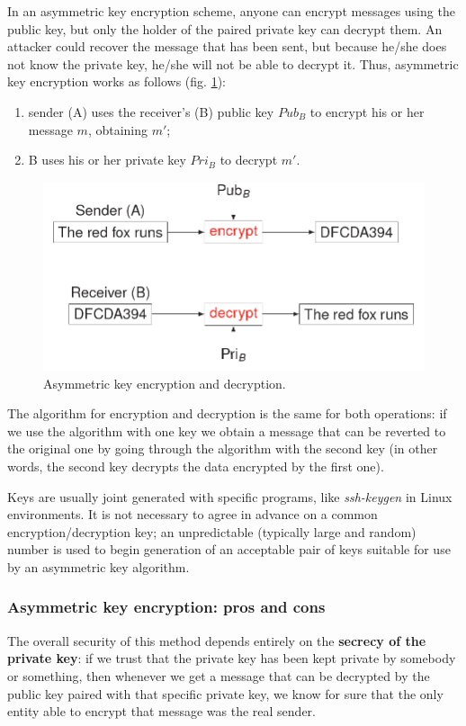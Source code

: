 In an asymmetric key encryption scheme, anyone can encrypt messages using the public key, but only the holder of the paired private key can decrypt them.  An attacker could recover the message that has been sent, but because he/she does not know the private key, he/she will not be able to decrypt it. Thus, asymmetric key encryption works as follows (fig. \ref{fig:asymm}):

\begin{enumerate}
    \item sender (A) uses the receiver's (B) public key $Pub_B$ to encrypt his or her message $m$, obtaining $m'$;
    \item B uses his or her private key $Pri_B$ to decrypt $m'$.
\end{enumerate}

\begin{figure}[H]
\centering
\includegraphics[scale=0.5]{img/asymmkey.png}
\decoRule
\caption{Asymmetric key encryption and decryption.}
\label{fig:asymm}
\end{figure}

The algorithm for encryption and decryption is the same for both operations: if we use the algorithm with one key we obtain a message that can be reverted to the original one by going through the algorithm with the second key (in other words, the second key decrypts the data encrypted by the first one).

Keys are usually joint generated with specific programs, like \textit{ssh-keygen} in Linux environments. It is not necessary to agree in advance on a common encryption/decryption key; an unpredictable (typically large and random) number is used to begin generation of an acceptable pair of keys suitable for use by an asymmetric key algorithm.


\subsubsection{Asymmetric key encryption: pros and cons}
The overall security of this method depends entirely on the \textbf{secrecy of the private key}: if we trust that the private key has been kept private by somebody or something, then whenever we get a message that can be decrypted by the public key paired with that specific private key, we know for sure that the only entity able to encrypt that message was the real sender. 


